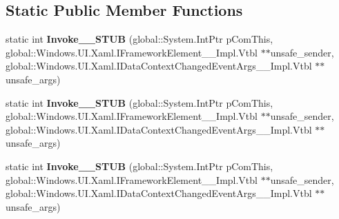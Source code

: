 \subsection*{Static Public Member Functions}
\begin{DoxyCompactItemize}
\item 
\mbox{\label{struct_windows_1_1_foundation_1_1_typed_event_handler___a___windows___u_i___xaml___framework_ele0f0aa82fcf85c345ad8a6f22953a8130_aff537680bb5472719a42f61d44c804c3}} 
static int {\bfseries Invoke\+\_\+\+\_\+\+S\+T\+UB} (global\+::\+System.\+Int\+Ptr p\+Com\+This, global\+::\+Windows.\+U\+I.\+Xaml.\+I\+Framework\+Element\+\_\+\+\_\+\+Impl.\+Vtbl $\ast$$\ast$unsafe\+\_\+sender, global\+::\+Windows.\+U\+I.\+Xaml.\+I\+Data\+Context\+Changed\+Event\+Args\+\_\+\+\_\+\+Impl.\+Vtbl $\ast$$\ast$unsafe\+\_\+args)
\item 
\mbox{\label{struct_windows_1_1_foundation_1_1_typed_event_handler___a___windows___u_i___xaml___framework_ele0f0aa82fcf85c345ad8a6f22953a8130_aff537680bb5472719a42f61d44c804c3}} 
static int {\bfseries Invoke\+\_\+\+\_\+\+S\+T\+UB} (global\+::\+System.\+Int\+Ptr p\+Com\+This, global\+::\+Windows.\+U\+I.\+Xaml.\+I\+Framework\+Element\+\_\+\+\_\+\+Impl.\+Vtbl $\ast$$\ast$unsafe\+\_\+sender, global\+::\+Windows.\+U\+I.\+Xaml.\+I\+Data\+Context\+Changed\+Event\+Args\+\_\+\+\_\+\+Impl.\+Vtbl $\ast$$\ast$unsafe\+\_\+args)
\item 
\mbox{\label{struct_windows_1_1_foundation_1_1_typed_event_handler___a___windows___u_i___xaml___framework_ele0f0aa82fcf85c345ad8a6f22953a8130_aff537680bb5472719a42f61d44c804c3}} 
static int {\bfseries Invoke\+\_\+\+\_\+\+S\+T\+UB} (global\+::\+System.\+Int\+Ptr p\+Com\+This, global\+::\+Windows.\+U\+I.\+Xaml.\+I\+Framework\+Element\+\_\+\+\_\+\+Impl.\+Vtbl $\ast$$\ast$unsafe\+\_\+sender, global\+::\+Windows.\+U\+I.\+Xaml.\+I\+Data\+Context\+Changed\+Event\+Args\+\_\+\+\_\+\+Impl.\+Vtbl $\ast$$\ast$unsafe\+\_\+args)
\item 
\mbox{\label{struct_windows_1_1_foundation_1_1_typed_event_handler___a___windows___u_i___xaml___framework_ele0f0aa82fcf85c345ad8a6f22953a8130_aff537680bb5472719a42f61d44c804c3}} 

\end{DoxyCompactItemize}

